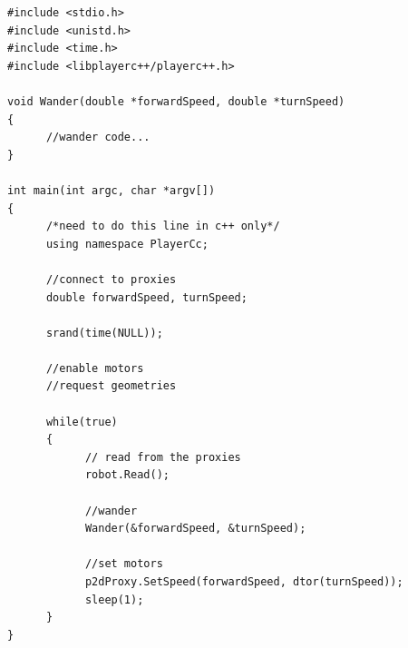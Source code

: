 \documentclass[a4paper]{report}
\begin{document}
\begin{verbatim}
#include <stdio.h>
#include <unistd.h>
#include <time.h>
#include <libplayerc++/playerc++.h>

void Wander(double *forwardSpeed, double *turnSpeed)
{
      //wander code...
} 

int main(int argc, char *argv[])
{	
      /*need to do this line in c++ only*/
      using namespace PlayerCc;

      //connect to proxies
      double forwardSpeed, turnSpeed;
	
      srand(time(NULL));
	
      //enable motors
      //request geometries
	
      while(true)
      {		
            // read from the proxies
            robot.Read();

            //wander
            Wander(&forwardSpeed, &turnSpeed);
		
            //set motors
            p2dProxy.SetSpeed(forwardSpeed, dtor(turnSpeed));
            sleep(1);
      }
}
\end{verbatim}
\end{document}
